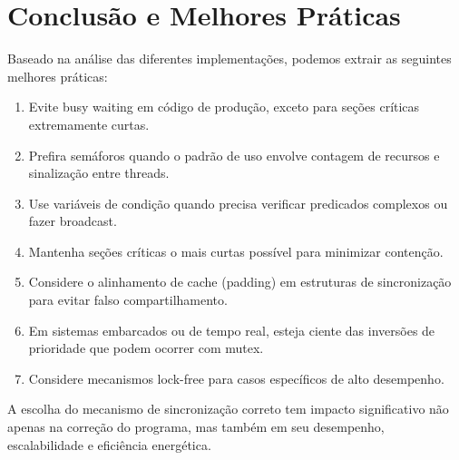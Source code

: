 \documentclass[12pt]{article}
\begin{document}
\section{Conclusão e Melhores Práticas}

Baseado na análise das diferentes implementações, podemos extrair as seguintes melhores práticas:

\begin{enumerate}
    \item Evite busy waiting em código de produção, exceto para seções críticas extremamente curtas.
    \item Prefira semáforos quando o padrão de uso envolve contagem de recursos e sinalização entre threads.
    \item Use variáveis de condição quando precisa verificar predicados complexos ou fazer broadcast.
    \item Mantenha seções críticas o mais curtas possível para minimizar contenção.
    \item Considere o alinhamento de cache (padding) em estruturas de sincronização para evitar falso compartilhamento.
    \item Em sistemas embarcados ou de tempo real, esteja ciente das inversões de prioridade que podem ocorrer com mutex.
    \item Considere mecanismos lock-free para casos específicos de alto desempenho.
\end{enumerate}

A escolha do mecanismo de sincronização correto tem impacto significativo não apenas na correção do programa, mas também em seu desempenho, escalabilidade e eficiência energética.
\end{document}
